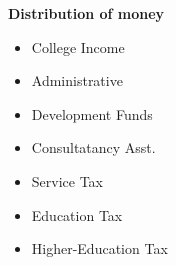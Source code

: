 



\newpage
{\bf Distribution of money}\\

\begin{itemize}
\item College Income
\item Administrative
\item Development Funds
\item Consultatancy Asst.
\item Service Tax
\item Education Tax
\item Higher-Education Tax
\end{itemize}
